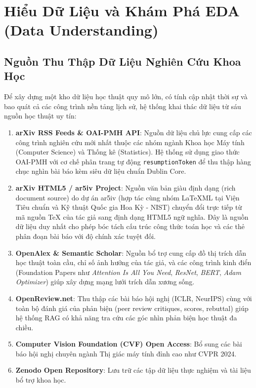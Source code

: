 
\chapter{Hiểu Dữ Liệu và Khám Phá EDA (Data Understanding)}
\label{chap:data_understanding}

\section{Nguồn Thu Thập Dữ Liệu Nghiên Cứu Khoa Học}

Để xây dựng một kho dữ liệu học thuật quy mô lớn, có tính cập nhật thời sự và bao quát cả các công trình nền tảng lịch sử, hệ thống khai thác dữ liệu từ sáu nguồn học thuật uy tín:

\begin{enumerate}[label=\textbf{\arabic*.}]
  \item \textbf{arXiv RSS Feeds \& OAI-PMH API}: Nguồn dữ liệu chủ lực cung cấp các công trình nghiên cứu mới nhất thuộc các nhóm ngành Khoa học Máy tính (Computer Science) và Thống kê (Statistics). Hệ thống sử dụng giao thức OAI-PMH với cơ chế phân trang tự động \texttt{resumptionToken} để thu thập hàng chục nghìn bài báo kèm siêu dữ liệu chuẩn Dublin Core.
  \item \textbf{arXiv HTML5 / ar5iv Project}: Nguồn văn bản giàu định dạng (rich document source) do dự án ar5iv (hợp tác cùng nhóm LaTeXML tại Viện Tiêu chuẩn và Kỹ thuật Quốc gia Hoa Kỳ - NIST) chuyển đổi trực tiếp từ mã nguồn TeX của tác giả sang định dạng HTML5 ngữ nghĩa. Đây là nguồn dữ liệu duy nhất cho phép bóc tách cấu trúc công thức toán học và các thẻ phân đoạn bài báo với độ chính xác tuyệt đối.
  \item \textbf{OpenAlex \& Semantic Scholar}: Nguồn bổ trợ cung cấp đồ thị trích dẫn học thuật toàn cầu, chỉ số ảnh hưởng của tác giả, và các công trình kinh điển (Foundation Papers như \textit{Attention Is All You Need}, \textit{ResNet}, \textit{BERT}, \textit{Adam Optimizer}) giúp xây dựng mạng lưới trích dẫn xương sống.
  \item \textbf{OpenReview.net}: Thu thập các bài báo hội nghị (ICLR, NeurIPS) cùng với toàn bộ đánh giá của phản biện (peer review critiques, scores, rebuttal) giúp hệ thống RAG có khả năng tra cứu các góc nhìn phản biện học thuật đa chiều.
  \item \textbf{Computer Vision Foundation (CVF) Open Access}: Bổ sung các bài báo hội nghị chuyên ngành Thị giác máy tính đỉnh cao như CVPR 2024.
  \item \textbf{Zenodo Open Repository}: Lưu trữ các tập dữ liệu thực nghiệm và tài liệu bổ trợ khoa học.
\end{enumerate}

